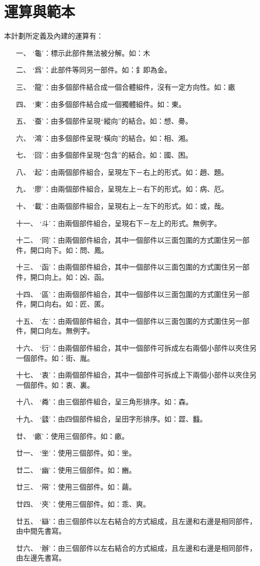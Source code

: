 \section{運算與範本}
本計劃所定義及內建的運算有：
\begin{enumerate}
\item[一、]`龜'：標示此部件無法被分解。如：木
\item[二、]`爲'：此部件等同另一部件。如：釒即為金。
\item[三、]`龍'：由多個部件結合成一個合體組件，沒有一定方向性。如：畞
\item[四、]`東'：由多個部件結合成一個獨體組件。如：東。
\item[五、]`蚕'：由多個部件呈現``縱向''的結合。如：想、臱。
\item[六、]`鴻'：由多個部件呈現``橫向''的結合。如：相、湘。
\item[七、]`回'：由多個部件呈現``包含''的結合。如：國、困。

\item[八、]`起'：由兩個部件組合，呈現左下－右上的形式。如：趙、題。
\item[九、]`廖'：由兩個部件組合，呈現左上－右下的形式。如：病、厄。
\item[十、]`載'：由兩個部件組合，呈現右上－左下的形式。如：或，哉。
\item[十一、]`斗'：由兩個部件組合，呈現右下－左上的形式。無例字。

\item[十二、]`同'：由兩個部件組合，其中一個部件以三面包圍的方式圍住另一部件，開口向下。如：問、鳳。
\item[十三、]`函'：由兩個部件組合，其中一個部件以三面包圍的方式圍住另一部件，開口向上。如：凶、函。
\item[十四、]`區'：由兩個部件組合，其中一個部件以三面包圍的方式圍住另一部件，開口向右。如：匠、匿。
\item[十五、]`左'：由兩個部件組合，其中一個部件以三面包圍的方式圍住另一部件，開口向左。無例字。

\item[十六、]`衍'：由兩個部件組合，其中一個部件可拆成左右兩個小部件以夾住另一個部件。如：街、胤。
\item[十七、]`衷'：由兩個部件組合，其中一個部件可拆成上下兩個小部件以夾住另一個部件。如：衷、裏。
\item[十八、]`粦'：由三個部件組合，呈三角形排序。如：森。
\item[十九、]`瓥'：由四個部件組合，呈田字形排序。如：歰、蠽。

\item[廿、]`畞'：使用三個部件。如：畞。
\item[廿一、]`㘴'：使用三個部件。如：㘴。
\item[廿二、]`幽'：使用三個部件。如：豳。
\item[廿三、]`㒳'：使用三個部件。如：繭。
\item[廿四、]`夾'：使用三個部件。如：乖、爽。
\item[廿五、]`䜌'：由三個部件以左右結合的方式組成，且左邊和右邊是相同部件，由中間先書寫。
\item[廿六、]`辦'：由三個部件以左右結合的方式組成，且左邊和右邊是相同部件，由左邊先書寫。
\end{enumerate}

